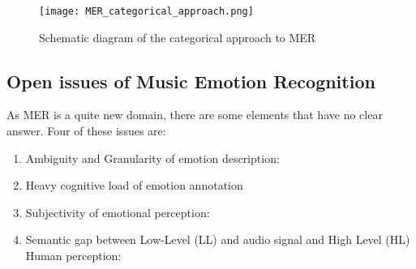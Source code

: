 \begin{figure}[h]
    \centering
    \texttt{[image: MER\_categorical\_approach.png]} 
	\caption{Schematic diagram of the categorical approach to MER}
    \label{fig:MER_categorical_approach}
\end{figure}

\subsection{Open issues of Music Emotion Recognition}
As MER is a quite new domain, there are some elements that have no clear answer. Four of these issues are:
\begin{enumerate}
	\item Ambiguity and Granularity of emotion description:
	\item Heavy cognitive load of emotion annotation
	\item Subjectivity of emotional perception:
	\item Semantic gap between Low-Level (LL) and audio signal and High Level (HL) Human perception:
\end{enumerate}





